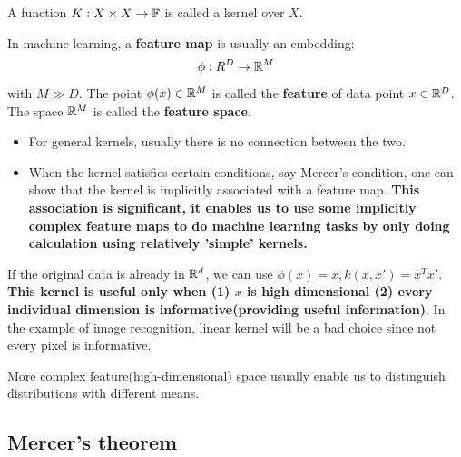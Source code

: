 \begin{refsection}
\begin{definition}[kernel] 
	\cite[90]{mohri2012foundations}A function $K:X\times X \to \mathbb{F}$ is called a kernel over $X$.
\end{definition}


\begin{definition}
	In machine learning, a \textbf{feature map} is usually an embedding:
	$$\phi:R^D\to\mathbb{R}^M$$
	with $M \gg D$. The point $\phi(x) \in \mathbb{R}^M$ is called the \textbf{feature} of data point $x\in \mathbb{R}^D$.
	The space $\mathbb{R}^M$ is called the \textbf{feature space}.
\end{definition}

\begin{remark}
	\begin{itemize}\hfill
		\item For general kernels, usually there is no connection between the two.
		\item When the kernel satisfies certain conditions, say Mercer's condition, one can show that the kernel is implicitly associated with a feature map. \textbf{This association is significant, it enables us to use some implicitly complex feature maps to do machine learning tasks by only doing calculation using relatively 'simple' kernels.}
	\end{itemize}
\end{remark}



\begin{example}
	\cite[484]{murphy2012machine} If the original data is already in $\mathbb{R}^d$, we can use $\phi(x) = x,k(x,x')= x^Tx'$. \textbf{This kernel is useful only when (1) $x$ is high dimensional (2) every individual dimension is informative(providing useful information)}. In the example of image recognition, linear kernel will be a bad choice since not every pixel is informative.  
\end{example}


\begin{remark}
	More complex feature(high-dimensional) space usually enable us to distinguish distributions with different means.
\end{remark}





\subsection{Mercer's theorem}


\end{refsection}
